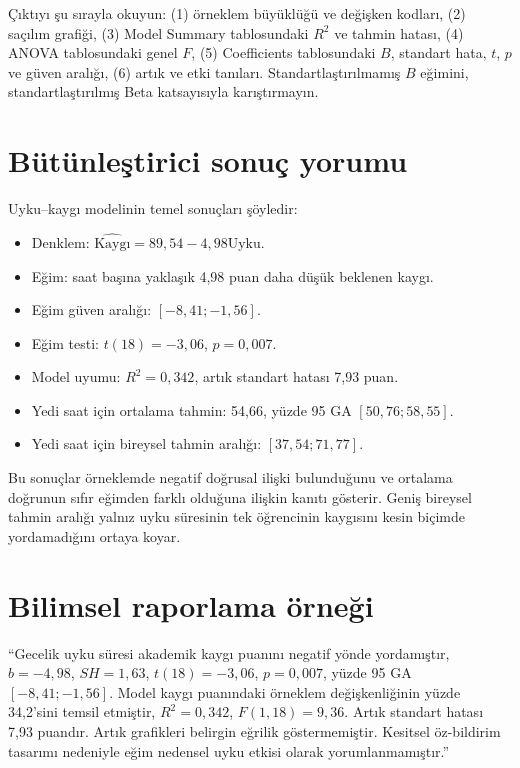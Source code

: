 \begin{outputguidebox}
Çıktıyı şu sırayla okuyun: (1) örneklem büyüklüğü ve değişken kodları, (2)
saçılım grafiği, (3) Model Summary tablosundaki $R^2$ ve tahmin hatası, (4)
ANOVA tablosundaki genel $F$, (5) Coefficients tablosundaki $B$, standart hata,
$t$, $p$ ve güven aralığı, (6) artık ve etki tanıları. Standartlaştırılmamış
$B$ eğimini, standartlaştırılmış Beta katsayısıyla karıştırmayın.
\end{outputguidebox}

\section{Bütünleştirici sonuç yorumu}

Uyku--kaygı modelinin temel sonuçları şöyledir:

\begin{itemize}
  \item Denklem: $\widehat{\text{Kaygı}}=89{,}54-4{,}98\text{Uyku}$.
  \item Eğim: saat başına yaklaşık 4,98 puan daha düşük beklenen kaygı.
  \item Eğim güven aralığı: $[-8{,}41;-1{,}56]$.
  \item Eğim testi: $t(18)=-3{,}06$, $p=0{,}007$.
  \item Model uyumu: $R^2=0{,}342$, artık standart hatası 7,93 puan.
  \item Yedi saat için ortalama tahmin: 54,66, yüzde 95 GA $[50{,}76;58{,}55]$.
  \item Yedi saat için bireysel tahmin aralığı: $[37{,}54;71{,}77]$.
\end{itemize}

Bu sonuçlar örneklemde negatif doğrusal ilişki bulunduğunu ve ortalama
doğrunun sıfır eğimden farklı olduğuna ilişkin kanıtı gösterir. Geniş bireysel
tahmin aralığı yalnız uyku süresinin tek öğrencinin kaygısını kesin biçimde
yordamadığını ortaya koyar.

\section{Bilimsel raporlama örneği}

``Gecelik uyku süresi akademik kaygı puanını negatif yönde yordamıştır,
$b=-4{,}98$, $SH=1{,}63$, $t(18)=-3{,}06$, $p=0{,}007$, yüzde 95 GA
$[-8{,}41;-1{,}56]$. Model kaygı puanındaki örneklem değişkenliğinin yüzde
34,2'sini temsil etmiştir, $R^2=0{,}342$, $F(1,18)=9{,}36$.
Artık standart hatası 7,93 puandır. Artık grafikleri belirgin eğrilik
göstermemiştir. Kesitsel öz-bildirim tasarımı nedeniyle eğim nedensel uyku
etkisi olarak yorumlanmamıştır.''

